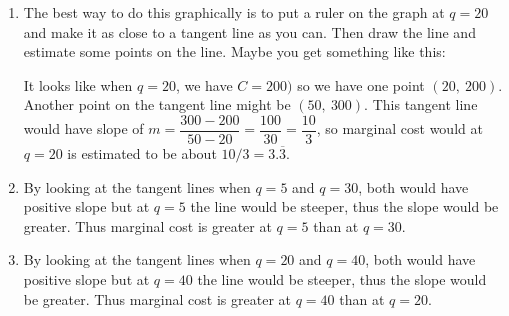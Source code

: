 \documentclass[oneside]{book}
\theoremstyle{definition}
\theoremstyle{solution}
\newtheorem*{solution}{Solution}
\newenvironment{solution}{\vspace{2in}\comment}{\endcomment}
\begin{document}
\begin{solution}
\begin{enumerate}
\item The best way to do this graphically is to put a ruler on the
  graph at $q=20$ and make it as close to a tangent line as you can.
  Then draw the line and estimate some points on the line.  Maybe you
  get something like this:
\begin{center}
\end{center}
It looks like when $q = 20$, we have $C = 200)$ so we have one point
$(20,\ 200)$.  Another point on the tangent line might be
$(50,\ 300)$.  This tangent line would have slope of
$m = \dfrac{300-200}{50-20} = \dfrac{100}{30} = \dfrac{10}{3}$, so
marginal cost would at $q = 20$ is estimated to be about
$10/3 = 3.\overline{3}$.

\item By looking at the tangent lines when $q = 5$ and $q = 30$, both
  would have positive slope but at $q = 5$ the line would be steeper,
  thus the slope would be greater.  Thus marginal cost is greater at
  $q = 5$ than at $q = 30$.

\item By looking at the tangent lines when $q = 20$ and $q = 40$, both
  would have positive slope but at $q = 40$ the line would be steeper,
  thus the slope would be greater.  Thus marginal cost is greater at
  $q = 40$ than at $q = 20$.
\end{enumerate}
\end{solution}
\end{document}
